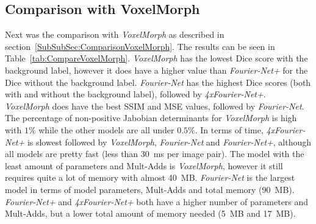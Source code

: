 \subsection{Comparison with VoxelMorph} \label{SubSec:ResultsComparisonVoxelMorph}
Next was the comparison with \emph{VoxelMorph} as described in section~\ref{SubSubSec:ComparisonVoxelMorph}. The results can be seen in Table~\ref{tab:CompareVoxelMorph}. \emph{VoxelMorph} has the lowest Dice score with the background label, however it does have a higher value than \emph{Fourier-Net+} for the Dice without the background label. \emph{Fourier-Net} has the highest Dice scores (both with and without the background label), followed by \emph{4xFourier-Net+}. \emph{VoxelMorph} does have the best SSIM and MSE values, followed by \emph{Fourier-Net}. The percentage of non-positive Jabobian determinants for \emph{VoxelMorph} is high with $1\%$ while the other models are all under $0.5\%$. In terms of time, \emph{4xFourier-Net+} is slowest followed by \emph{VoxelMorph}, \emph{Fourier-Net} and \emph{Fourier-Net+}, although all models are pretty fast (less than 30~ms per image pair). The model with the least amount of parameters and Mult-Adds is \emph{VoxelMorph}, however it still requires quite a lot of memory with almost 40~MB. \emph{Fourier-Net} is the largest model in terms of model parameters, Mult-Adds and total memory (90~MB). \emph{Fourier-Net+} and \emph{4xFourier-Net+} both have a higher number of parameters and Mult-Adds, but a lower total amount of memory needed (5~MB and 17~MB). 

